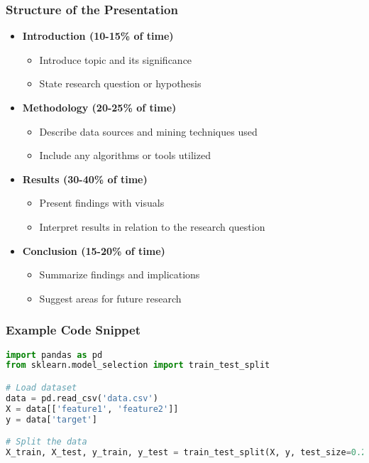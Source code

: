 \documentclass[aspectratio=169]{beamer}
\begin{document}
\begin{frame}[fragile]
    \frametitle{Structure of the Presentation}
    \begin{itemize}
        \item \textbf{Introduction (10-15\% of time)}
        \begin{itemize}
            \item Introduce topic and its significance
            \item State research question or hypothesis
        \end{itemize}

        \item \textbf{Methodology (20-25\% of time)}
        \begin{itemize}
            \item Describe data sources and mining techniques used
            \item Include any algorithms or tools utilized
        \end{itemize}

        \item \textbf{Results (30-40\% of time)}
        \begin{itemize}
            \item Present findings with visuals
            \item Interpret results in relation to the research question
        \end{itemize}

        \item \textbf{Conclusion (15-20\% of time)}
        \begin{itemize}
            \item Summarize findings and implications
            \item Suggest areas for future research
        \end{itemize}
    \end{itemize}
\end{frame}

\begin{frame}[fragile]
    \frametitle{Example Code Snippet}
    \begin{lstlisting}[language=Python]
import pandas as pd
from sklearn.model_selection import train_test_split

# Load dataset
data = pd.read_csv('data.csv')
X = data[['feature1', 'feature2']]
y = data['target']

# Split the data
X_train, X_test, y_train, y_test = train_test_split(X, y, test_size=0.2, random_state=42)
    \end{lstlisting}
\end{frame}
\end{document}
